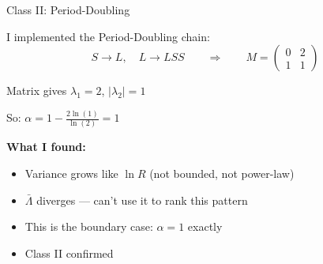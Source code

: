 \documentclass[aspectratio=169, 11pt]{beamer}
\begin{document}
\begin{frame}{Class II: Period-Doubling}

I implemented the Period-Doubling chain:
\[
S \to L, \quad L \to LSS \qquad \Rightarrow \qquad M = \begin{pmatrix} 0 & 2 \\ 1 & 1 \end{pmatrix}
\]

\vspace{0.5em}
Matrix gives $\lambda_1 = 2$, $|\lambda_2| = 1$

\vspace{0.3em}
So: $\displaystyle\alpha = 1 - \frac{2\ln(1)}{\ln(2)} = 1$

\vspace{0.5em}
\textbf{What I found:}
\begin{itemize}
    \item Variance grows like $\ln R$ (not bounded, not power-law)
    \item $\bar{\Lambda}$ diverges --- can't use it to rank this pattern
    \item This is the boundary case: $\alpha = 1$ exactly
    \item \colorbox{resultbg}{Class II confirmed}
\end{itemize}
\end{frame}
\end{document}

